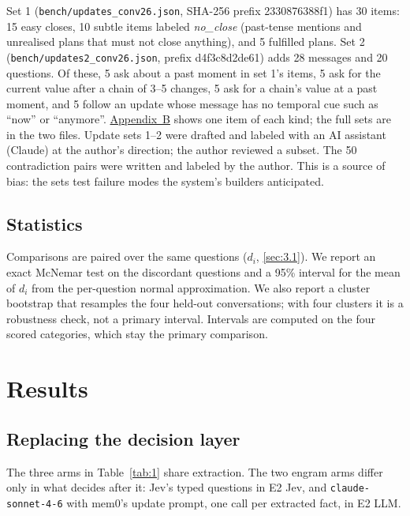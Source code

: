 \documentclass[11pt]{article}
\newcommand{\src}[1]{}
\begin{document}
Set 1 (\texttt{bench/\allowbreak{}updates\_\allowbreak{}conv26.json}, SHA-256 prefix 2330876388f1\src{bench/updates\_conv26.json}) has 30\src{bench/updates\_conv26.json} items: 15\src{bench/updates\_conv26.json} easy closes, 10\src{bench/updates\_conv26.json} subtle items labeled \emph{no\_close} (past-tense mentions and unrealised plans that must not close anything), and 5\src{bench/updates\_conv26.json} fulfilled plans. Set 2 (\texttt{bench/\allowbreak{}updates2\_\allowbreak{}conv26.json}, prefix d4f3c8d2de61\src{bench/updates2\_conv26.json}) adds 28\src{bench/updates2\_conv26.json} messages and 20\src{bench/updates2\_conv26.json} questions. Of these, 5\src{bench/updates2\_conv26.json} ask about a past moment in set 1's items, 5\src{bench/updates2\_conv26.json} ask for the current value after a chain of 3--5 changes, 5\src{bench/updates2\_conv26.json} ask for a chain's value at a past moment, and 5\src{bench/updates2\_conv26.json} follow an update whose message has no temporal cue such as ``now'' or ``anymore''. \hyperref[app:B]{Appendix~B} shows one item of each kind; the full sets are in the two files. Update sets 1--2 were drafted and labeled with an AI assistant (Claude) at the author's direction; the author reviewed a subset. The 50 contradiction pairs were written and labeled by the author. This is a source of bias: the sets test failure modes the system's builders anticipated.

\subsection{Statistics}\label{sec:4.4}
Comparisons are paired over the same questions ($d_i$, \cref{sec:3.1}). We report an exact McNemar test on the discordant questions and a 95\% interval for the mean of $d_i$ from the per-question normal approximation. We also report a cluster bootstrap that resamples the four held-out conversations; with four clusters it is a robustness check, not a primary interval. Intervals are computed on the four scored categories, which stay the primary comparison.

\section{Results}\label{sec:5}
\subsection{Replacing the decision layer}\label{sec:5.1}
The three arms in Table~\ref{tab:1} share extraction. The two engram arms differ only in what decides after it: Jev's typed questions in E2 Jev, and \texttt{claude-sonnet-4-6} with mem0's update prompt, one call per extracted fact, in E2 LLM.
\end{document}

